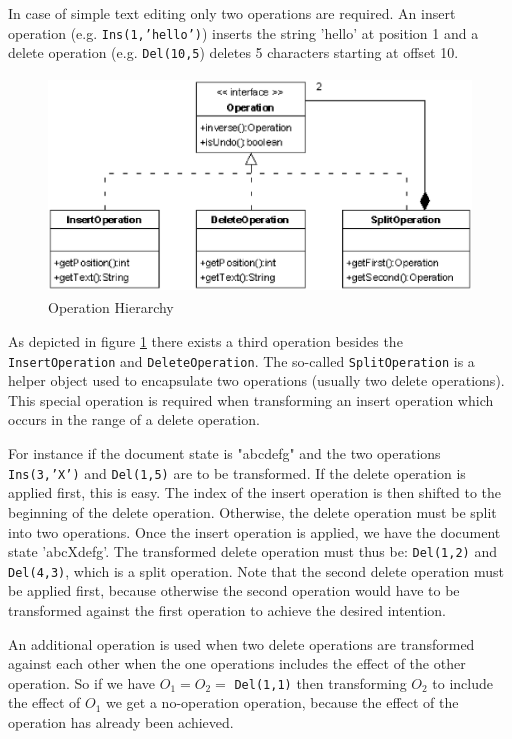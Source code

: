 In case of simple text editing only two operations are required. An insert 
operation (e.g. \texttt{Ins(1,'hello')}) inserts the string 'hello' at position 
1 and a delete operation (e.g. \texttt{Del(10,5}) deletes 5 characters
starting at offset 10.

\begin{figure}[H]
\centering
\includegraphics[height=5.74cm,width=11.59cm]{../images/finalreport/algorithm_operation.eps}
\caption{Operation Hierarchy}
\label{Operation Hierarchy}
\end{figure}

\label{Split_Operation}
As depicted in figure \ref{Operation Hierarchy} there exists a third operation besides the \texttt{InsertOperation} and \texttt{DeleteOperation}. The so-called \texttt{SplitOperation} is a helper object used to encapsulate two operations (usually two delete operations). This special operation is required when transforming an insert operation which occurs in the range of a delete operation. 

For instance if the document state is "abcdefg" and the two operations
\texttt{Ins(3,'X')} and \texttt{Del(1,5)} are to be transformed. If
the delete operation is applied first, this is easy. The index of the insert
operation is then shifted to the beginning of the delete operation. Otherwise,
the delete operation must be split into two operations. Once the insert
operation is applied, we have the document state 'abcXdefg'. The transformed
delete operation must thus be: \texttt{Del(1,2)} and \texttt{Del(4,3)},
which is a split operation. Note that the second delete operation must be
applied first, because otherwise the second operation would have to be
transformed against the first operation to achieve the desired intention.

An additional operation is used when two delete operations are transformed
against each other when the one operations includes the effect of the other
operation. So if we have $O_1 = O_2 = $ \texttt{Del(1,1)} then transforming
$O_2$ to include the effect of $O_1$ we get a no-operation operation, because
the effect of the operation has already been achieved.


